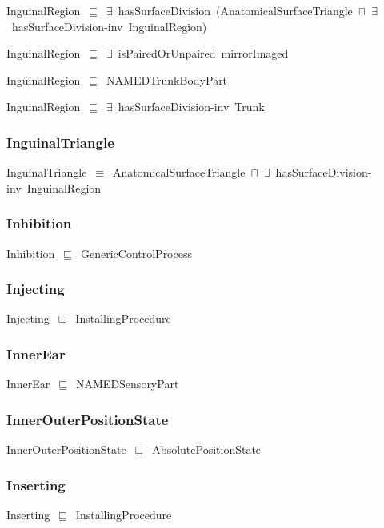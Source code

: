 \documentclass{article}
\begin{document}
InguinalRegion~\ensuremath{\sqsubseteq}~\ensuremath{\exists}~hasSurfaceDivision~(AnatomicalSurfaceTriangle~\ensuremath{\sqcap}~\ensuremath{\exists}~hasSurfaceDivision-inv~InguinalRegion)~

InguinalRegion~\ensuremath{\sqsubseteq}~\ensuremath{\exists}~isPairedOrUnpaired~mirrorImaged~

InguinalRegion~\ensuremath{\sqsubseteq}~NAMEDTrunkBodyPart~

InguinalRegion~\ensuremath{\sqsubseteq}~\ensuremath{\exists}~hasSurfaceDivision-inv~Trunk~

\subsubsection*{InguinalTriangle}

InguinalTriangle~\ensuremath{\equiv}~AnatomicalSurfaceTriangle~\ensuremath{\sqcap}~\ensuremath{\exists}~hasSurfaceDivision-inv~InguinalRegion

\subsubsection*{Inhibition}

Inhibition~\ensuremath{\sqsubseteq}~GenericControlProcess~

\subsubsection*{Injecting}

Injecting~\ensuremath{\sqsubseteq}~InstallingProcedure~

\subsubsection*{InnerEar}

InnerEar~\ensuremath{\sqsubseteq}~NAMEDSensoryPart~

\subsubsection*{InnerOuterPositionState}

InnerOuterPositionState~\ensuremath{\sqsubseteq}~AbsolutePositionState~

\subsubsection*{Inserting}

Inserting~\ensuremath{\sqsubseteq}~InstallingProcedure~
\end{document}
